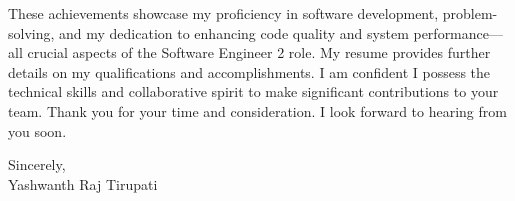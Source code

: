 \documentclass[letterpaper,11pt]{article}
\begin{document}
\begin{flushleft}
\vspace{12pt}

These achievements showcase my proficiency in software development, problem-solving, and my dedication to enhancing code quality and system performance—all crucial aspects of the Software Engineer 2 role. My resume provides further details on my qualifications and accomplishments. I am confident I possess the technical skills and collaborative spirit to make significant contributions to your team.  Thank you for your time and consideration. I look forward to hearing from you soon.


\vspace{20pt}

Sincerely, \\
Yashwanth Raj Tirupati

\end{flushleft}
\end{document}
